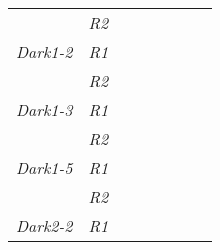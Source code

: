 \begin{table}[h]
\begin{tabular}{@{}|l|l|llllll@{}}
                     & \textit{R2}          &                                         &                                        &                                         &                                             &                       &                                          \\ \cmidrule(r){1-2}
\textit{Dark1-2}     & \textit{R1}          &                                         &                                        &                                         & \multicolumn{1}{l|}{}                       & \multicolumn{1}{l|}{} &                                          \\ \cmidrule(lr){2-2}
                     & \textit{R2}          &                                         &                                        &                                         &                                             &                       &                                          \\ \cmidrule(r){1-2}
\textit{Dark1-3}     & \textit{R1}          &                                         &                                        &                                         & \multicolumn{1}{l|}{}                       & \multicolumn{1}{l|}{} &                                          \\ \cmidrule(lr){2-2}
                     & \textit{R2}          &                                         &                                        &                                         &                                             &                       &                                          \\ \cmidrule(r){1-2}
\textit{Dark1-5}     & \textit{R1}          &                                         &                                        &                                         & \multicolumn{1}{l|}{}                       & \multicolumn{1}{l|}{} &                                          \\ \cmidrule(lr){2-2}
                     & \textit{R2}          &                                         &                                        &                                         &                                             &                       &                                          \\ \cmidrule(r){1-2}
\textit{Dark2-2}     & \textit{R1}          &                                         &                                        &                                         & \multicolumn{1}{l|}{}                       & \multicolumn{1}{l|}{} &                                          \\ \cmidrule(lr){2-2}

\end{tabular}
\end{table}
